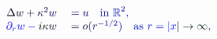 \documentclass[12pt]{article}
\begin{document}
\makeatletter
\renewcommand*{\@textcolor}[3]{%
  \protect\leavevmode
  \begingroup
    \color#1{#2}#3%
  \endgroup
}
\makeatother
\begin{displaymath}
\begin{array} {rl} { \mathcolor[RGB]{0,0,15}{\Delta} \mathcolor[RGB]{0,0,30}{w} \mathcolor[RGB]{0,0,45}{+} \mathcolor[RGB]{0,0,60}{\kappa} ^ { \mathcolor[RGB]{0,0,75}{2} } \mathcolor[RGB]{0,0,90}{w} } & { { } \mathcolor[RGB]{0,0,105}{=} \mathcolor[RGB]{0,0,120}{u} \quad \mathrm { \mathcolor[RGB]{0,0,135}{i} \mathcolor[RGB]{0,0,150}{n} ~ } \mathbb { \mathcolor[RGB]{0,0,165}{R} } ^ { \mathcolor[RGB]{0,0,180}{2} } \mathcolor[RGB]{0,0,195}{,} } \\ { \mathcolor[RGB]{0,0,210}{\partial} _ { \mathcolor[RGB]{0,0,225}{r} } \mathcolor[RGB]{0,0,240}{w} \mathcolor[RGB]{0,0,255}{-} \mathcolor[RGB]{0,15,0}{i} \mathcolor[RGB]{0,15,15}{\kappa} \mathcolor[RGB]{0,15,30}{w} } & { { } \mathcolor[RGB]{0,15,45}{=} \mathcolor[RGB]{0,15,60}{o} \mathcolor[RGB]{0,15,75}{(} \mathcolor[RGB]{0,15,90}{r} ^ { \mathcolor[RGB]{0,15,105}{-} \mathcolor[RGB]{0,15,120}{1} \mathcolor[RGB]{0,15,135}{/} \mathcolor[RGB]{0,15,150}{2} } \mathcolor[RGB]{0,15,165}{)} \quad \mathrm { \mathcolor[RGB]{0,15,180}{a} \mathcolor[RGB]{0,15,195}{s} ~ } \mathcolor[RGB]{0,15,210}{r} \mathcolor[RGB]{0,15,225}{=} \mathcolor[RGB]{0,15,240}{|} \mathcolor[RGB]{0,15,255}{x} \mathcolor[RGB]{0,30,0}{|} \mathcolor[RGB]{0,30,15}{\rightarrow} \mathcolor[RGB]{0,30,30}{\infty} \mathcolor[RGB]{0,30,45}{,} } \end{array}
\end{displaymath}
\end{document}
